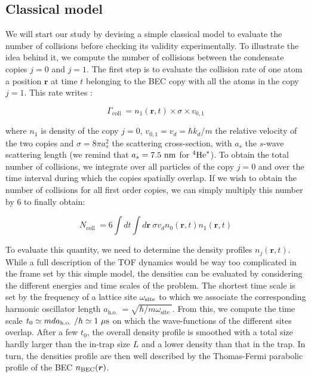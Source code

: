 \subsection{Classical model}

We will start our study by devising a simple classical model to evaluate the number of collisions before checking its validity experimentally. To illustrate the idea behind it, we compute the number of collisions between the condensate copies $j=0$ and $j=1$. The first step is to evaluate the collision rate of one atom a position $\bm{r}$ at time $t$ belonging to the BEC copy with all the atoms in the copy $j=1$. This rate writes \cite{chikkatur2000suppression,perrin:tel-00244641}:

\begin{equation}
    \Gamma_{\text {coll }}=n_{1}(\bm{r}, t) \times \sigma \times v_{0,1}
\end{equation}

\noindent where $n_1$ is density of the copy $j=0$, $v_{0,1}=v_d=\hbar k_d/m$ the relative velocity of the two copies and $\sigma= 8 \pi a_s^2$ the scattering cross-section, with $a_s$ the $s$-wave scattering length (we remind that $a_s = 7.5 \ \rm{nm}$ for $^4\mathrm{He}^*$). To obtain the total number of collisions, we integrate over all particles of the copy $j=0$ and over the time interval during which the copies spatially overlap. If we wish to obtain the number of collisions for all first order copies, we can simply multiply this number by $6$ to finally obtain:

\begin{equation}
    N_{\text {coll }}=6 \int d t \int d \bm{r} \ \sigma v_{d} n_{0}(\bm{r}, t) n_{1}(\bm{r}, t)
    \label{eq:coll_model_general}
\end{equation}

To evaluate this quantity, we need to determine the density profiles $n_{j}(\bm{r}, t)$. While a full description of the TOF dynamics would be way too complicated in the frame set by this simple model, the densities can be evaluated by considering the different energies and time scales of the problem. The shortest time scale is set by the frequency of a lattice site $\omega_{\rm{site}}$ to which we associate the corresponding harmonic oscillator length $a_{\text {h.o. }}=\sqrt{\hbar / m \omega_{\text {site }}}$. From this, we compute the time scale $t_0 \simeq m d a_{\text {h.o. }} /h \simeq 1 \ \mu \rm{s}$ on which the wave-functions of the different sites overlap. After a few $t_0$, the overall density profile is smoothed with a total size hardly larger than the in-trap size $L$ and a lower density than that in the trap. In turn, the densities profile are then well described by the Thomas-Fermi parabolic profile of the BEC $n_{\rm{BEC}}(\bm{r})$.

